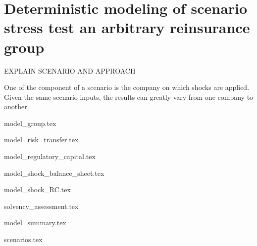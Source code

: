 \chapter{Deterministic modeling of scenario stress test an arbitrary reinsurance group}



EXPLAIN SCENARIO AND APPROACH

One of the component of a scenario is the company on which shocks are applied. Given the same scenario inputs, the results can greatly vary from one company to another. 



{model_group.tex}


{model_risk_transfer.tex}


{model_regulatory_capital.tex}



{model_shock_balance_sheet.tex}

{model_shock_RC.tex}

{solvency_assessment.tex}

{model_summary.tex}

{scenarios.tex}

